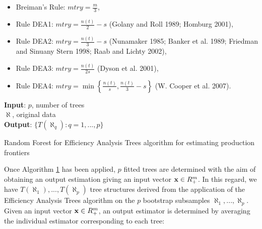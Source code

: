 \begin{itemize}
\item
  Breiman's Rule: \(mtry=\frac{m}{3}\),
\item
  Rule DEA1: \(mtry=\frac{n\left(t\right)}{2} -s\) (Golany and Roll 1989; Homburg 2001),
\item
  Rule DEA2: \(mtry=\frac{n\left(t\right)}{3} -s\) (Nunamaker 1985; Banker et al. 1989; Friedman and Sinuany Stern 1998; Raab and Lichty 2002),
\item
  Rule DEA3: \(mtry=\frac{n\left(t\right)}{2s}\) (Dyson et al. 2001),
\item
  Rule DEA4: \(mtry=\min \left\{\frac{n\left(t\right)}{s}, \frac{n\left(t\right)}{3} -s\right\}\) (W. Cooper et al. 2007).
\end{itemize}

\begin{algorithm}
\label{alg:algo1}
\SetAlgoLined
\textbf{Input}: $p$, number of trees \\
                $\aleph$, original data \\
\textbf{Output}: $\{T(\aleph_q): q = 1,..., p\}$ \\
 \caption{Random Forest for Efficiency Analysis Trees algorithm for estimating production frontiers}
\end{algorithm}

Once Algorithm \hyperref[alg:algo1]{1} has been applied, \(p\) fitted trees are determined with the aim of obtaining an output estimation giving an input vector \({\it \textbf{x}}\in R_{+}^{m}\). In this regard, we have \(T\left(\aleph _{1} \right),...,T\left(\aleph _{p} \right)\) tree structures derived from the application of the Efficiency Analysis Trees algorithm on the \(p\) bootstrap subsamples \(\aleph _{1} ,...,\aleph _{p}\). Given an input vector \({\it \textbf{x}}\in R_{+}^{m}\), an output estimator is determined by averaging the individual estimator corresponding to each tree:

